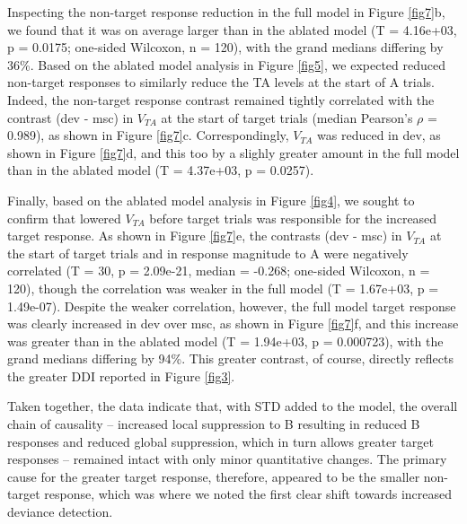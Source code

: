 \documentclass[pdflatex,referee,iicol,sn-basic]{sn-jnl}
\theoremstyle{thmstyleone}%
\theoremstyle{thmstyletwo}%
\theoremstyle{thmstylethree}%
\begin{document}
Inspecting the non-target response reduction in the full model in Figure \ref{fig7}b, we found that it was on average larger than in the ablated model (T = 4.16e+03, p = 0.0175; one-sided Wilcoxon, n = 120), with the grand medians differing by 36\%. Based on the ablated model analysis in Figure \ref{fig5}, we expected reduced non-target responses to similarly reduce the TA levels at the start of A trials. Indeed, the non-target response contrast remained tightly correlated with the contrast (dev - msc) in $V_{TA}$ at the start of target trials (median Pearson's $\rho$ = 0.989), as shown in Figure \ref{fig7}c. Correspondingly, $V_{TA}$ was reduced in dev, as shown in Figure \ref{fig7}d, and this too by a slighly greater amount in the full model than in the ablated model (T = 4.37e+03, p = 0.0257).

Finally, based on the ablated model analysis in Figure \ref{fig4}, we sought to confirm that lowered $V_{TA}$ before target trials was responsible for the increased target response. As shown in Figure \ref{fig7}e, the contrasts (dev - msc) in $V_{TA}$ at the start of target trials and in response magnitude to A were negatively correlated (T = 30, p = 2.09e-21, median = -0.268; one-sided Wilcoxon, n = 120), though the correlation was weaker in the full model (T = 1.67e+03, p = 1.49e-07). Despite the weaker correlation, however, the full model target response was clearly increased in dev over msc, as shown in Figure \ref{fig7}f, and this increase was greater than in the ablated model (T = 1.94e+03, p = 0.000723), with the grand medians differing by 94\%. This greater contrast, of course, directly reflects the greater DDI reported in Figure \ref{fig3}.

Taken together, the data indicate that, with STD added to the model, the overall chain of causality -- increased local suppression to B resulting in reduced B responses and reduced global suppression, which in turn allows greater target responses -- remained intact with only minor quantitative changes. The primary cause for the greater target response, therefore, appeared to be the smaller non-target response, which was where we noted the first clear shift towards increased deviance detection.
\end{document}
